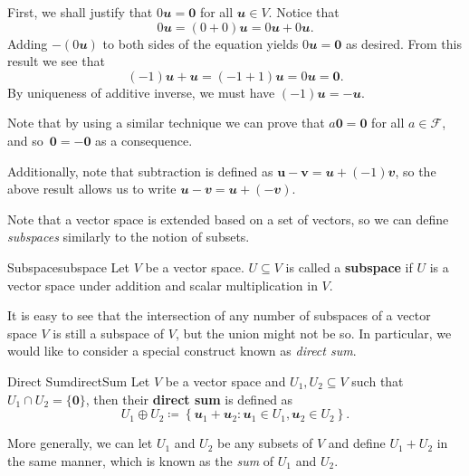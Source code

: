 \documentclass[math, code]{amznotes}
\theoremstyle{remark}
\newcommand{\zero}{\mathbf{0}}
\begin{document}
First, we shall justify that $0\mathbfit{u} = \zero$ for all $\mathbfit{u} \in V$. Notice that
\begin{equation*}
    0\mathbfit{u} = (0 + 0)\mathbfit{u} = 0\mathbfit{u} + 0\mathbfit{u}.
\end{equation*}
Adding $-(0\mathbfit{u})$ to both sides of the equation yields $0\mathbfit{u} = \zero$ as desired. From this result we see that
\begin{equation*}
    (-1)\mathbfit{u} + \mathbfit{u} = (-1 + 1)\mathbfit{u} = 0\mathbfit{u} = \zero.
\end{equation*}
By uniqueness of additive inverse, we must have $(-1)\mathbfit{u} = -\mathbfit{u}$.

Note that by using a similar technique we can prove that $a\zero = \zero$ for all $a \in \mathcal{F}$, and so~$\zero = -\zero$ as a consequence.

Additionally, note that subtraction is defined as $\mathbf{u - v} = \mathbfit{u} + (-1)\mathbfit{v}$, so the above result allows us to write $\mathbfit{u - v} = \mathbfit{u} + (-\mathbfit{v})$.

Note that a vector space is extended based on a set of vectors, so we can define \textit{subspaces} similarly to the notion of subsets.
\begin{dfnbox}{Subspace}{subspace}
    Let $V$ be a vector space. $U \subseteq V$ is called a {\color{red} \textbf{subspace}} if $U$ is a vector space under addition and scalar multiplication in $V$.
\end{dfnbox}
It is easy to see that the intersection of any number of subspaces of a vector space $V$ is still a subspace of $V$, but the union might not be so. In particular, we would like to consider a special construct known as \textit{direct sum}.
\begin{dfnbox}{Direct Sum}{directSum}
    Let $V$ be a vector space and $U_1, U_2 \subseteq V$ such that $U_1 \cap U_2 = \{\zero\}$, then their {\color{red} \textbf{direct sum}} is defined as
    \begin{equation*}
        U_1 \oplus U_2 \coloneqq \left\{\mathbfit{u}_1 + \mathbfit{u}_2 \colon \mathbfit{u}_1 \in U_1, \mathbfit{u}_2 \in U_2\right\}.
    \end{equation*}
\end{dfnbox}
More generally, we can let $U_1$ and $U_2$ be any subsets of $V$ and define $U_1 + U_2$ in the same manner, which is known as the \textit{sum} of $U_1$ and $U_2$.
\end{document}
